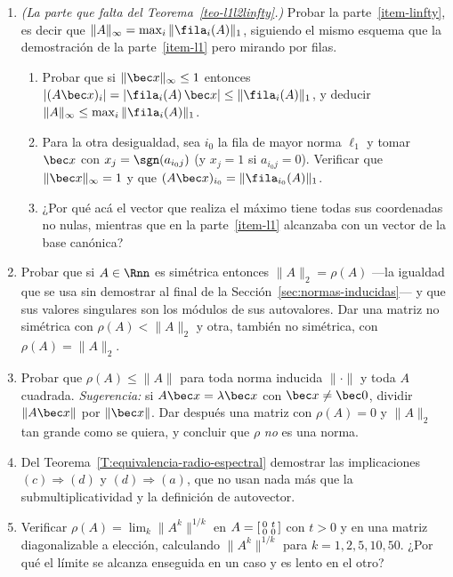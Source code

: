 \begin{enumerate}
\item\label{ej-linfty} \emph{(La parte que falta del
Teorema~\ref{teo-l1l2linfty}.)} Probar la parte~\ref{item-linfty}, es decir
que $\|A\|_\infty=\max_i\|\fila_i(A)\|_1$, siguiendo el mismo esquema que la
demostración de la parte~\ref{item-l1} pero mirando por filas.
\begin{enumerate}[label=\textup{(\alph*)}]
\item Probar que si $\|\bec x\|_\infty\le1$ entonces
$|(A\bec x)_i|=|\fila_i(A)\,\bec x|\le\|\fila_i(A)\|_1$, y deducir
$\|A\|_\infty\le\max_i\|\fila_i(A)\|_1$.
\item Para la otra desigualdad, sea $i_0$ la fila de mayor norma $\ell_1$ y
tomar $\bec x$ con $x_j=\sgn(a_{i_0j})$ (y $x_j=1$ si
$a_{i_0j}=0$). Verificar que $\|\bec x\|_\infty=1$ y que
$(A\bec x)_{i_0}=\|\fila_{i_0}(A)\|_1$.
\item ¿Por qué acá el vector que realiza el máximo tiene todas sus
coordenadas no nulas, mientras que en la parte~\ref{item-l1} alcanzaba con un
vector de la base canónica?
\end{enumerate}

\item\label{ej-simetrica-rho} Probar que si $A\in\Rnn$ es simétrica entonces
$\|A\|_2=\rho(A)$ ---la igualdad que se usa sin demostrar al final de la
Sección~\ref{sec:normas-inducidas}--- y que sus valores singulares son los
módulos de sus autovalores. Dar una matriz no simétrica con
$\rho(A)<\|A\|_2$ y otra, también no simétrica, con $\rho(A)=\|A\|_2$.

\item\label{ej-rho-cota} Probar que $\rho(A)\le\|A\|$ para toda norma inducida
$\|\cdot\|$ y toda $A$ cuadrada. \emph{Sugerencia:} si $A\bec x=\lambda\bec x$
con $\bec x\neq\bec 0$, dividir $\|A\bec x\|$ por $\|\bec x\|$. Dar después
una matriz con $\rho(A)=0$ y $\|A\|_2$ tan grande como se quiera, y concluir
que $\rho$ \emph{no} es una norma.

\item\label{ej-equivalencias} Del Teorema~\ref{T:equivalencia-radio-espectral}
demostrar las implicaciones $(c)\Rightarrow(d)$ y $(d)\Rightarrow(a)$, que no
usan nada más que la submultiplicatividad y la definición de autovector.

\item\label{ej-potencias} Verificar $\rho(A)=\lim_k\|A^k\|^{1/k}$ en
$A=\begin{bsmallmatrix}0&t\\ 0&0\end{bsmallmatrix}$ con $t>0$ y en una matriz
diagonalizable a elección, calculando $\|A^k\|^{1/k}$ para
$k=1,2,5,10,50$. ¿Por qué el límite se alcanza enseguida en un caso y es lento
en el otro?


\end{enumerate}
